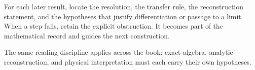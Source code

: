 \begin{readerroadmap}[title={A reusable reading discipline}]
For each later result, locate the resolution, the transfer rule, the reconstruction statement, and the hypotheses that justify differentiation or passage to a limit. When a step fails, retain the explicit obstruction. It becomes part of the mathematical record and guides the next construction.
\end{readerroadmap}

The same reading discipline applies across the book: exact algebra, analytic reconstruction, and physical interpretation must each carry their own hypotheses.
